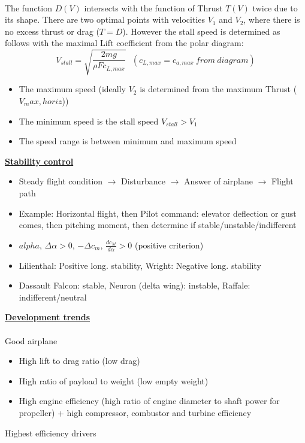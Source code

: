 \documentclass[9pt, landscape, fleqn]{scrartcl}
\begin{document}
\begin{multicols*}{3}
\begin{align*}
\end{align*}
The function $D(V)$ intersects with the function of Thrust $T(V)$ twice due to its shape. There are two optimal points with velocities $V_1$ and $V_2$, where there is no excess thrust or drag ($T=D$). However the stall speed is determined as follows with the maximal Lift coefficient from the polar diagram:
\begin{equation*}
    V_{stall} = \sqrt{\frac{2mg}{\rho F c_{L,max}}}~~~(c_{L,max} = c_{a,max} ~from~diagram)
\end{equation*}
\begin{itemize}
    \item The maximum speed (ideally $V_2$ is determined from the maximum Thrust ($V_max, horiz$))
    \item The minimum speed is the stall speed $V_{stall} > V_1$
    \item The speed range is between minimum and maximum speed
\end{itemize}
\underline{\textbf{Stability control}}
\begin{itemize}
    \item Steady flight condition $\rightarrow$ Disturbance $\rightarrow$ Answer of airplane $\rightarrow$ Flight path
    \item Example: Horizontal flight, then Pilot command: elevator deflection or gust comes, then pitching moment, then determine if stable/unstable/indifferent
    \item $alpha$, $\Delta \alpha > 0$, $-\Delta c_m$, $\frac{dc_M}{d\alpha} > 0$ (positive criterion)
    \item Lilienthal: Positive long. stability, Wright: Negative long. stability
    \item Dassault Falcon: stable, Neuron (delta wing): instable, Raffale: indifferent/neutral
\end{itemize}
\underline{\textbf{Development trends}} \\ \\
Good airplane
\begin{itemize}
    \item High lift to drag ratio (low drag)
    \item High ratio of payload to weight (low empty weight)
    \item High engine efficiency (high ratio of engine diameter to shaft power for propeller) + high compressor, combustor and turbine efficiency
\end{itemize}
Highest efficiency drivers
\begin{itemize}

\end{itemize}
\end{multicols*}
\end{document}
